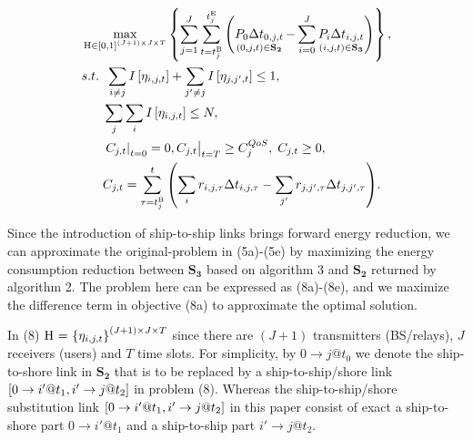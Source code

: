 \documentclass[conference]{IEEEtran}
\begin{document}
\begin{subequations}
  \begin{align}
  & \mathop {\max }\limits_{{\mathbf{{\rm H}}} \in {{\left[ {0,1} \right]}^{\left( {J + 1} \right) \times J \times T}}} \left\{ {{\sum\limits_{j = 1}^J \sum\limits_{t = {t_j^{\rm{B}}}}^{t_j^{\rm{E}}}{\left(  {\mathop {{P_{0}}\Delta t_{0,j,t} }\limits_{\left( {0,j,t} \right) \in {{\mathbf{S}}_{\mathbf{2}}}}  - \sum\limits_{i = 0}^J {\mathop {{P_{i}}\Delta t_{i,j,t}}\limits_{\left( {i,j,t} \right) \in {{\mathbf{S}}_{\mathbf{3}}}} } } \right)} } } \right\}, \\
  & {s.t.} \;\; \sum\limits_{i \ne j} { I\left[ {{\eta _{i,j,t}}} \right] }  + \sum\limits_{j' \ne j} { I\left[ {{\eta _{j,j',t}}} \right]  \le {1}}, \\
  & \;\;\;\;\;\; \sum\limits_j {\sum\limits_i { I\left[ {{\eta _{i,j,t}}} \right] } }  \le N, \\
  & \;\;\;\;\;\; {\left. {{{\left. {{C_{j,t}}} \right|}_{t = 0}} = 0, {C_{j,t}}} \right|_{t = T}} \ge C_j^{QoS} ,\; {C_{j,t}} \ge 0, \\
  & \;\;\;\;\;\; {C_{j,t}} = \sum\limits_{\tau  = t_j^{\rm{B}}}^t {\left( {\sum\limits_i {{r_{i,j,\tau }}\Delta t_{i,j,\tau}}  - \sum\limits_{j'} {{r_{j,j',\tau }}\Delta t_{j,j',\tau}} } \right)} .
  \end{align}
  \end{subequations}

Since the introduction of ship-to-ship links brings forward energy reduction, we can approximate the original-problem in (5a)-(5e) by maximizing the energy consumption reduction between ${{\mathbf{S}}_{\mathbf{3}}}$ based on algorithm 3 and ${{\mathbf{S}}_{\mathbf{2}}}$ returned by algorithm 2. The problem here can be expressed as (8a)-(8e), and we maximize the difference term in objective (8a) to approximate the optimal solution. 
  

In (8) ${\mathbf{{\rm H}}}{\text{ = }}{\left\{ {{\eta _{i,j,t}}} \right\}^{\left( {J + 1} \right) \times J \times T}}$ since 
there are $\left( {J + 1} \right)$ transmitters (BS/relays), $J$ receivers (users) and $T$ time slots. For simplicity, by $0 \to j@{t_0}$ we denote the ship-to-shore link in ${{\mathbf{S}}_{\mathbf{2}}}$ that is to be replaced by a ship-to-ship/shore link $\left[ {{\rm{0}} \to i'@{t_1},i' \to j@{t_2}} \right]$ in problem (8). Whereas the ship-to-ship/shore substitution link $\left[ {{\rm{0}} \to i'@{t_1},i' \to j@{t_2}} \right]$ in this paper consist of exact a ship-to-shore part $0 \to i'@{t_1}$ and a ship-to-ship part $i' \to j@{t_2}$. 
\end{document}

